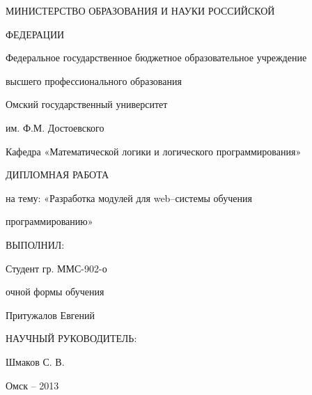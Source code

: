 \thispagestyle{empty}
\large
\begin{center}
МИНИСТЕРСТВО ОБРАЗОВАНИЯ И НАУКИ РОССИЙСКОЙ \par
ФЕДЕРАЦИИ\par 
\vspace{6mm}
Федеральное государственное бюджетное образовательное учреждение\par 
высшего профессионального образования\par 
\vspace{6mm}
Омский государственный университет\par 
им. Ф.М. Достоевского\par 
\vspace{6mm}
Кафедра «Математической логики и логического программирования»\par 
\vspace{6mm}
ДИПЛОМНАЯ РАБОТА\par
на тему: «Разработка модулей для web–системы обучения\par программированию»\par


\end{center}

\vspace{36mm}
\begin{flushright}

ВЫПОЛНИЛ:\par
Студент гр. ММС-902-о\par
очной формы обучения\par
Притужалов Евгений\par

\vspace{6mm}
НАУЧНЫЙ РУКОВОДИТЕЛЬ: \par
Шмаков С. В.\par


\end{flushright}


\vspace{60mm}
\begin{center}
{Омск -- 2013}
\end{center}

\newpage